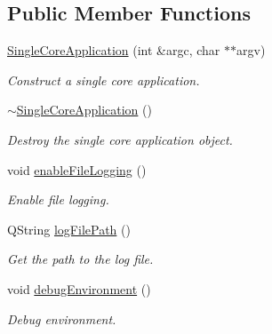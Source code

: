 \subsection*{Public Member Functions}
\begin{DoxyCompactItemize}
\item 
\hyperlink{class_mdt_1_1_single_core_application_a18493beac6e321df7852571ed4a55205}{Single\+Core\+Application} (int \&argc, char $\ast$$\ast$argv)
\begin{DoxyCompactList}\small\item\em Construct a single core application. \end{DoxyCompactList}\item 
\hyperlink{class_mdt_1_1_single_core_application_ab3a61d6e1a5b36be02de6eba1c2f3867}{$\sim$\+Single\+Core\+Application} ()
\begin{DoxyCompactList}\small\item\em Destroy the single core application object. \end{DoxyCompactList}\item 
void \hyperlink{class_mdt_1_1_single_core_application_ae9084643bbbc67ce795dca5d6aae35fe}{enable\+File\+Logging} ()
\begin{DoxyCompactList}\small\item\em Enable file logging. \end{DoxyCompactList}\item 
Q\+String \hyperlink{class_mdt_1_1_single_core_application_a3f680ab0c6467712d7ba495e20adbafa}{log\+File\+Path} ()
\begin{DoxyCompactList}\small\item\em Get the path to the log file. \end{DoxyCompactList}\item 
void \hyperlink{class_mdt_1_1_single_core_application_a95e8cfb94a48a1c52e5896b74c78783f}{debug\+Environment} ()
\begin{DoxyCompactList}\small\item\em Debug environment. \end{DoxyCompactList}\end{DoxyCompactItemize}
